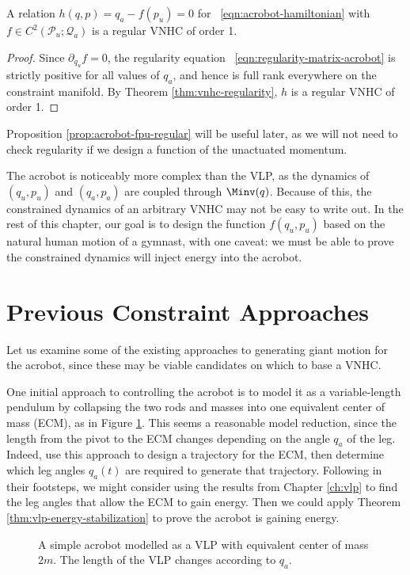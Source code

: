 \begin{prop}\label{prop:acrobot-fpu-regular}
    A relation \(h(q,p) = q_a - f(p_u) = 0\) for ~\eqref{eqn:acrobot-hamiltonian} 
    with \(f \in C^2\left(\mathcal{P}_u; \mathcal{Q}_a\right)\) is a regular
    VNHC of order 1.
\end{prop}
\begin{proof}
    Since \(\partial_{q_u} f = 0\), the regularity equation
    ~\eqref{eqn:regularity-matrix-acrobot} is strictly positive for all values
    of \(q_a\), and hence is full rank everywhere on the constraint manifold.
    By Theorem \ref{thm:vnhc-regularity}, \(h\) is a regular VNHC of order 1.
\end{proof}
Proposition \ref{prop:acrobot-fpu-regular} will be useful later, as we will not
need to check regularity if we design a function of the unactuated momentum. 

The acrobot is noticeably more complex than the VLP, as
the dynamics of \((q_u,p_u)\) and \((q_a,p_a)\) are coupled through \(\Minv(q)\).
Because of this, the constrained dynamics of an arbitrary VNHC may not be easy
to write out.
In the rest of this chapter, our goal is to design the function \(f(q_u,p_u)\)
based on the natural human motion of a gymnast, with one caveat: 
we must be able to prove the constrained dynamics will inject energy into the
acrobot.

\section{Previous Constraint Approaches}
Let us examine some of the existing approaches to generating giant motion for
the acrobot, since these may be viable candidates on which to base a VNHC.

One initial approach to controlling the acrobot is to model it as a
variable-length pendulum by collapsing the two rods and masses into one
equivalent center of mass (ECM), as in Figure \ref{fig:acrobot-ecm}.
This seems a reasonable model reduction, since the length from the pivot to the
ECM changes depending on the angle \(q_a\) of the leg.
Indeed, \citet{swingup_giant_acrobot} use this approach to design a trajectory
for the ECM, then determine which leg angles \(q_a(t)\) are required to generate
that trajectory.
Following in their footsteps, we might consider using the results
from Chapter \ref{ch:vlp} to find the leg angles that allow the ECM to gain
energy. 
Then we could apply Theorem \ref{thm:vlp-energy-stabilization} to prove
the acrobot is gaining energy.
\begin{figure}
    \centering
    
    \caption{A simple acrobot modelled as a VLP with equivalent center of mass \(2m\). 
        The length of the VLP changes according to \(q_a\).}
    \label{fig:acrobot-ecm}
\end{figure}

